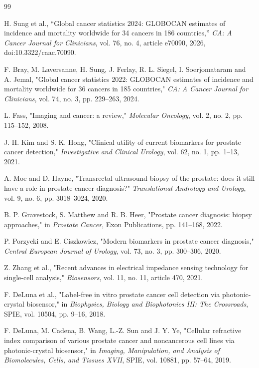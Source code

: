 \documentclass[5p,times,twocolumn]{elsarticle}
\begin{document}
\begin{thebibliography}{99}

 H. Sung et al., ``Global cancer statistics 2024: GLOBOCAN estimates of incidence and mortality worldwide for 34 cancers in 186 countries,'' \textit{CA: A Cancer Journal for Clinicians}, vol. 76, no. 4, article e70090, 2026, doi:10.3322/caac.70090.

 F. Bray, M. Laversanne, H. Sung, J. Ferlay, R. L. Siegel, I. Soerjomataram and A. Jemal, "Global cancer statistics 2022: GLOBOCAN estimates of incidence and mortality worldwide for 36 cancers in 185 countries," \textit{CA: A Cancer Journal for Clinicians}, vol. 74, no. 3, pp. 229--263, 2024.

 L. Fass, "Imaging and cancer: a review," \textit{Molecular Oncology}, vol. 2, no. 2, pp. 115--152, 2008.

 J. H. Kim and S. K. Hong, "Clinical utility of current biomarkers for prostate cancer detection," \textit{Investigative and Clinical Urology}, vol. 62, no. 1, pp. 1--13, 2021.

 A. Moe and D. Hayne, "Transrectal ultrasound biopsy of the prostate: does it still have a role in prostate cancer diagnosis?" \textit{Translational Andrology and Urology}, vol. 9, no. 6, pp. 3018--3024, 2020.

 B. P. Gravestock, S. Matthew and R. B. Heer, "Prostate cancer diagnosis: biopsy approaches," in \textit{Prostate Cancer}, Exon Publications, pp. 141--168, 2022.

 P. Porzycki and E. Ciszkowicz, "Modern biomarkers in prostate cancer diagnosis," \textit{Central European Journal of Urology}, vol. 73, no. 3, pp. 300--306, 2020.

 Z. Zhang et al., "Recent advances in electrical impedance sensing technology for single-cell analysis," \textit{Biosensors}, vol. 11, no. 11, article 470, 2021.

 F. DeLuna et al., "Label-free in vitro prostate cancer cell detection via photonic-crystal biosensor," in \textit{Biophysics, Biology and Biophotonics III: The Crossroads}, SPIE, vol. 10504, pp. 9--16, 2018.

 F. DeLuna, M. Cadena, B. Wang, L.-Z. Sun and J. Y. Ye, "Cellular refractive index comparison of various prostate cancer and noncancerous cell lines via photonic-crystal biosensor," in \textit{Imaging, Manipulation, and Analysis of Biomolecules, Cells, and Tissues XVII}, SPIE, vol. 10881, pp. 57--64, 2019.


\end{thebibliography}
\end{document}
